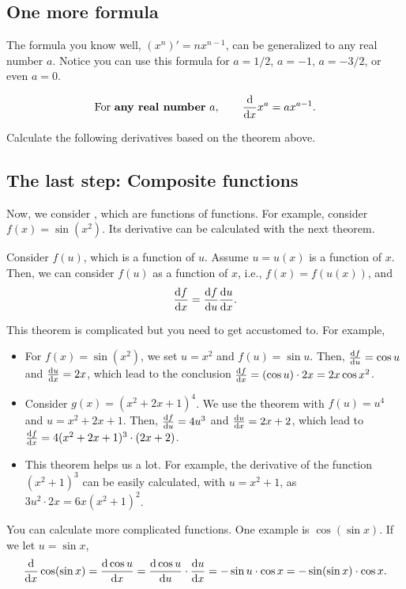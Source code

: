 \documentclass[11pt,pdfa,lastpage]{MishoNote}
\begin{document}
\subsection{One more formula}
The formula you know well, $(x^n)'=nx^{n-1}$, can be generalized to any real number $a$.
Notice you can use this formula for $a=1/2$, $a=-1$, $a=-3/2$, or even $a=0$.
\begin{theorem}{}{}
  \begin{equation}
  \text{For \Emph{any real number}}~a,\qquad \diff{}{x}x^a = ax^{a-1}.
  \end{equation}
\end{theorem}

\begin{problems}
\Problem[S] Calculate the following derivatives based on the theorem above.
\begin{menumerate}{3}
\end{menumerate}
\end{problems}

\subsection{The last step: Composite functions}
Now, we consider , which are functions of functions. For example, consider $f(x)=\sin(x^2)$. Its derivative can be calculated with the next theorem.
\begin{theorem}{}{}
  Consider $f(u)$, which is a function of $u$. Assume $u=u(x)$ is a function of $x$. Then, we can consider $f(u)$ as a function of $x$, i.e., $f(x)=f(u(x))$, and
  \begin{equation}
   \diff{f}{x}=\diff{f}{u}\diff{u}{x}.
  \end{equation}
\end{theorem}
\noindent
This theorem is complicated but you need to get accustomed to. For example,
  \begin{itemize}
    \item For $f(x)=\sin(x^2)$, we set $u=x^2$ and $f(u)=\sin u$. Then, $\diff fu=\cos u$ and $\diff ux=2x$, which lead to the conclusion $\diff fx=(\cos u)\cdot2x=2x\cos x^2$.
    \item Consider $g(x)=(x^2+2x+1)^4$. We use the theorem with $f(u)=u^4$ and $u=x^2+2x+1$. Then, $\diff fu=4u^3$ and $\diff ux=2x+2$, which lead to $\diff fx=4(x^2+2x+1)^3\cdot(2x+2)$.
    \\
    \item This theorem helps us a lot. For example, the derivative of the function $(x^2+1)^3$ can be easily calculated, with $u=x^2+1$, as $3u^2\cdot 2x=6x(x^2+1)^2$.
  \end{itemize}
You can calculate more complicated functions. One example is $\cos(\sin x)$. If we let $u=\sin x$,
  \[
  \diff{}{x}\cos(\sin x)=\diff{\cos{u}}{x}=\diff{\cos{u}}{u}\cdot\diff ux=-\sin u\cdot\cos x=-\sin(\sin x)\cdot\cos x.
  \]
\end{document}
